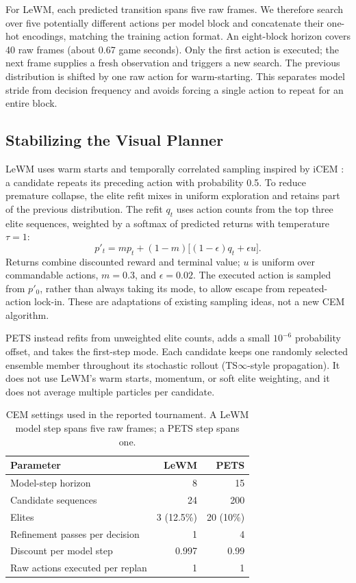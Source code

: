 \documentclass[10pt,twocolumn]{article}
\newcommand{\lewm}{LeWM}
\newcommand{\pets}{PETS}
\begin{document}
For \lewm{}, each predicted transition spans five raw frames.  We therefore
search over five potentially different actions per model block and
concatenate their one-hot encodings, matching the training action format.
An eight-block horizon covers 40 raw frames (about 0.67 game seconds).
Only the first action is executed; the next frame supplies a fresh
observation and triggers a new search.  The previous distribution is shifted
by one raw action for warm-starting.  This separates model stride from
decision frequency and avoids forcing a single action to repeat for an
entire block.

\subsection{Stabilizing the Visual Planner}

\lewm{} uses warm starts and temporally correlated sampling inspired by
iCEM \cite{pinneri2021icem}: a candidate repeats its preceding action with
probability 0.5.  To reduce premature collapse, the elite refit mixes in
uniform exploration and retains part of the previous distribution.
The refit $q_t$ uses action counts from the top three elite sequences,
weighted by a softmax of predicted returns with temperature $\tau=1$:
\begin{equation}
 p'_t = m p_t+(1-m)\bigl[(1-\epsilon)q_t+\epsilon u\bigr].
\end{equation}
Returns combine discounted reward and terminal value; $u$ is uniform over
commandable actions, $m=0.3$, and $\epsilon=0.02$.
The executed action is sampled from $p'_0$, rather than
always taking its mode, to allow escape from repeated-action lock-in.
These are adaptations of existing sampling ideas, not a new CEM algorithm.

\pets{} instead refits from unweighted elite counts, adds a small
$10^{-6}$ probability offset, and takes the first-step mode.  Each candidate
keeps one randomly selected ensemble member throughout its stochastic
rollout (TS$\infty$-style propagation).  It does not use \lewm{}'s warm starts,
momentum, or soft elite weighting, and it does not average multiple
particles per candidate.

\begin{table}[ht]
\centering
\caption{CEM settings used in the reported tournament.  A \lewm{} model
step spans five raw frames; a \pets{} step spans one.}
\label{tab:cem}
\small
\begin{tabular}{lrr}
\toprule
Parameter & \lewm{} & \pets{} \\
\midrule
Model-step horizon & 8 & 15 \\
Candidate sequences & 24 & 200 \\
Elites & 3 (12.5\%) & 20 (10\%) \\
Refinement passes per decision & 1 & 4 \\
Discount per model step & 0.997 & 0.99 \\
Raw actions executed per replan & 1 & 1 \\
\bottomrule
\end{tabular}
\end{table}
\end{document}
